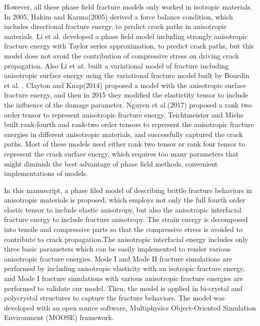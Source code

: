 \documentclass[3p,10pt,sort&compress]{elsarticle}
\begin{document}
However, all these phase field fracture models only worked in isotropic materials. In 2005, Hakim and Karma(2005) derived a force balance condition, which includes directional fracture energy, to predict crack paths in anisotropic materials. Li et al. \cite{li2015phase} developed a phase field model including strongly anisotropic fracture energy with Taylor series approximation, to predict crack paths, but this model does not avoid the contribution of compressive stress on driving crack propagation. Also Li et at. \cite{li2018variational} built a variational model of fracture including anisotropic surface energy using the variational fracture model built by Bourdin et al. \cite{bourdin2008variational}. Clayton and Knap(2014) \cite{clayton2014geometrically} proposed a model with the anisotropic surface fracture energy, and then in 2015\cite{clayton2015phase} they modified the elastictity tensor to include the influence of the damage parameter.  Nguyen et al.(2017) \cite{nguyen2017phase} proposed a rank two order tensor to represent anisotropic fracture energy. Teichtmeister and Miehe \cite{teichtmeister2015phase,teichtmeister2017phase} built rank-fourth and rank-two order tensors to represent the anisotropic fracture energies in different anisotropic materials, and successfully captured the crack paths. Most of these models used either rank two tensor or rank four tensor to represent the crack surface energy, which requires too many parameters that might diminish the best advantage of phase field methods, convenient implementations of models.

In this manuscript, a phase filed model of describing brittle fracture behaviors in anisotropic materials is proposed, which employs not only the full fourth order elastic tensor to include elastic anisotropy, but also the anisotropic interfacial fracture energy to include fracture anisotropy. The strain energy is decomposed into tensile and compressive parts so that the compressive stress is avoided to contribute to crack propagation.The anisotropic interfacial energy includes only three basic parameters which can be easily implemented to render various anisotropic fracture energies. Mode I and Mode II fracture simulations are performed by including anisotropic elasticity with an isotropic fracture energy, and Mode I fracture simulations with various anisotropic fracture energies  are performed to validate our model. Then, the model is applied in bi-crystal and polycrystal structures to capture the fracture behaviors. The model was developed with an open source software, Multiphysics Object-Oriented Simulation Environment (MOOSE) framework\cite{gaston2009moose}.
\end{document}
